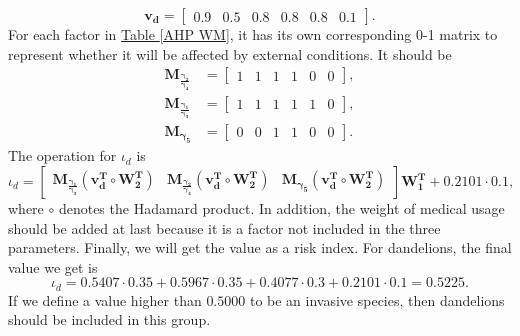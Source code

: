 \documentclass[12pt]{article}
\begin{document}
\begin{equation}
    \mathrm {\mathbf{v_d}}=\begin{bmatrix}
0.9 &0.5 &0.8
 &0.8 &0.8 &0.1
 \end{bmatrix}.
\end{equation}
For each factor in \hyperref[AHP WM]{Table \ref*{AHP WM}}, it has its own corresponding 0-1 matrix to represent whether it will be affected by external conditions. It should be
\begin{equation}
\begin{aligned}
    \mathrm {\mathbf{M_{\frac{\gamma_2}{\gamma_4}}}} & =\begin{bmatrix}
1 &1 &1
 &1 &0 &0
 \end{bmatrix},\\[0.5em]
 \mathrm {\mathbf{M_{\frac{\gamma_1}{\gamma_3}}}} & =\begin{bmatrix}
1&1 &1
 &1 &1 &0
 \end{bmatrix},\\[0.5em]
 \mathrm {\mathbf{M_{\gamma_5}}} & =\begin{bmatrix}
0 &0 &1
 &1 &0 &0
 \end{bmatrix}.
 \end{aligned}
\end{equation}
The operation for $\iota_d$ is 
\begin{equation}
    \iota_d=\begin{bmatrix}
\mathbf{M_{\frac{\gamma_1}{\gamma_3}}}(\mathbf{v_d^T}\circ \mathbf{W_2^T})
    &\mathbf{M_{\frac{\gamma_2}{\gamma_4}}}(\mathbf{v_d^T}\circ \mathbf{W_2^T})
    &\mathbf{M_{\gamma_5}}(\mathbf{v_d^T}\circ \mathbf{W_2^T})

\end{bmatrix}
\mathbf{W_1^T}+0.2101\cdot 0.1,
\end{equation}
where $\circ$ denotes the Hadamard product. In addition, the weight of medical usage should be added at last because it is a factor not included in the three parameters. Finally, we will get the value as a risk index. For dandelions, the final value we get is
\begin{equation}
    \iota_d=0.5407\cdot 0.35+0.5967\cdot 0.35+0.4077\cdot 0.3+0.2101\cdot0.1=0.5225.
\end{equation}
If we define a value higher than $0.5000$ to be an invasive species, then dandelions should be included in this group.
\end{document}
